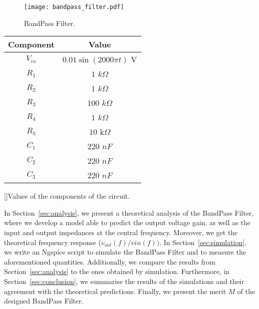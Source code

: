 \begin{figure}[H] \centering
\texttt{[image: bandpass\_filter.pdf]}
\caption{BandPass Filter.}
\label{fig:bandpass}
\end{figure}

\vspace{2mm}

\begin{center} 
\begin{tabular}{ | c | c | }
\hline
\textbf{Component} & \textbf{Value} \\
\hline
$V_{in}$ & $0.01\sin{(2000\pi t)}$ V \\
\hline
$R_1$ & $1$ $k\Omega$ \\
\hline
$R_2$ & $1$ $k\Omega$ \\
\hline
$R_3$ & $100$ $k\Omega$ \\
\hline
$R_4$ & $1$ $k\Omega$ \\
\hline
$R_5$ & $10$ k$\Omega$ \\
\hline
$C_1$ & $220$ $nF$ \\
\hline
$C_2$ & $220$ $nF$ \\
\hline
$C_3$ & $220$ $nF$ \\
\hline
\end{tabular}
[]{Values of the components of the circuit.}
\label{tab:components}
\end{center}

In Section~\ref{sec:analysis}, we present a theoretical analysis of the BandPass Filter, where we develop a model able to predict the output voltage gain, as well as the input and output impedances at the central frequency. Moreover, we get the theoretical frequency response ($v_{out}(f)/v{in}(f))$. In Section~\ref{sec:simulation}, we write an Ngspice script to simulate the BandPass Filter and to measure the aforementioned quantities. Additionally, we compare the results from Section~\ref{sec:analysis} to the ones obtained by simulation. Furthermore, in Section~\ref{sec:conclusion}, we summarise the results of the simulations and their agreement with the theoretical predictions. Finally, we present the merit $M$ of the designed BandPass Filter.

